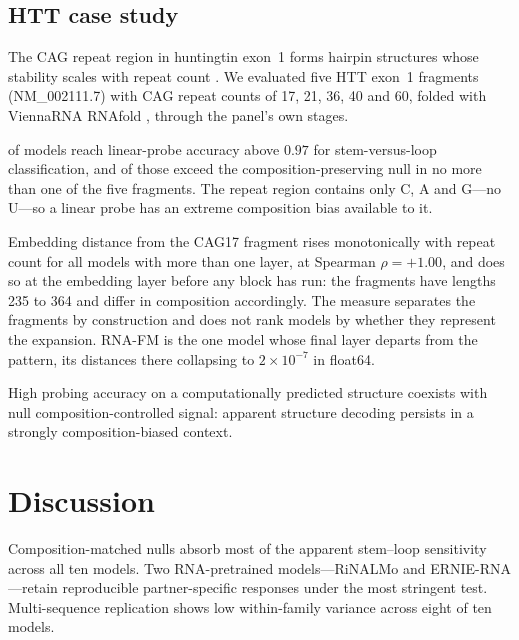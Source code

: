 \documentclass[11pt]{article}
\begin{document}
\subsection{HTT case study}
\label{sec:htt-results}

The CAG repeat region in huntingtin exon~1 forms hairpin structures whose
stability scales with repeat count \citep{demezer2011mutant,
krzyzosiak2012triplet}. We evaluated five HTT exon~1 fragments
(NM\_002111.7) with CAG repeat counts of 17, 21, 36, 40 and 60, folded with
ViennaRNA RNAfold \citep{lorenz2011viennarna}, through the panel's own stages.



\httHighProbing{} of \httModels{} models reach linear-probe accuracy above
$0.97$ for stem-versus-loop classification, and \httHighProbingClean{} of those
exceed the composition-preserving null in no more than one of the five
fragments. The repeat region contains only C, A and G---no U---so a linear
probe has an extreme composition bias available to it.

Embedding distance from the CAG17 fragment rises monotonically with repeat
count for all \httMonotone{} models with more than one layer, at Spearman
$\rho = +1.00$, and does so at the embedding layer before any block has run:
the fragments have lengths 235 to 364 and differ in composition accordingly.
The measure separates the fragments by construction and does not rank models by
whether they represent the expansion. RNA-FM is the one model whose final layer
departs from the pattern, its distances there collapsing to
$2 \times 10^{-7}$ in float64.

High probing accuracy on a computationally predicted structure coexists with
null composition-controlled signal: apparent structure decoding persists in a
strongly composition-biased context.


\section{Discussion}
\label{sec:discussion}

Composition-matched nulls absorb most of the apparent stem--loop
sensitivity across all ten models. Two RNA-pretrained models---RiNALMo and
ERNIE-RNA---retain reproducible partner-specific responses under the most
stringent test. Multi-sequence replication shows low within-family
variance across eight of ten models.
\end{document}
